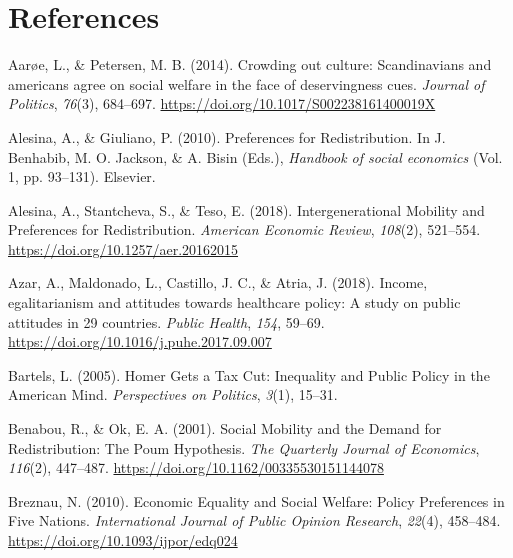 \documentclass[
  12pt,
]{book}
\newlength{\cslhangindent}
\newlength{\cslentryspacingunit} %
\newenvironment{CSLReferences}[2] %
 {%
  \setlength{\parindent}{0pt}
  \ifodd #1
  \let\oldpar\par
  \def\par{\hangindent=\cslhangindent\oldpar}
  \fi
  \setlength{\parskip}{#2\cslentryspacingunit}
 }%
 {}
\begin{document}
\hypertarget{references}{%
\chapter*{References}\label{references}}

\hypertarget{refs}{}
\begin{CSLReferences}{1}{0}
\leavevmode{}%
Aarøe, L., \& Petersen, M. B. (2014). Crowding out culture: {Scandinavians} and americans agree on social welfare in the face of deservingness cues. \emph{Journal of Politics}, \emph{76}(3), 684--697. \url{https://doi.org/10.1017/S002238161400019X}

\leavevmode{}%
Alesina, A., \& Giuliano, P. (2010). Preferences for {Redistribution}. In J. Benhabib, M. O. Jackson, \& A. Bisin (Eds.), \emph{Handbook of social economics} (Vol. 1, pp. 93--131). {Elsevier}.

\leavevmode{}%
Alesina, A., Stantcheva, S., \& Teso, E. (2018). Intergenerational {Mobility} and {Preferences} for {Redistribution}. \emph{American Economic Review}, \emph{108}(2), 521--554. \url{https://doi.org/10.1257/aer.20162015}

\leavevmode{}%
Azar, A., Maldonado, L., Castillo, J. C., \& Atria, J. (2018). Income, egalitarianism and attitudes towards healthcare policy: A study on public attitudes in 29 countries. \emph{Public Health}, \emph{154}, 59--69. \url{https://doi.org/10.1016/j.puhe.2017.09.007}

\leavevmode{}%
Bartels, L. (2005). Homer {Gets} a {Tax Cut}: {Inequality} and {Public Policy} in the {American Mind}. \emph{Perspectives on Politics}, \emph{3}(1), 15--31.

\leavevmode{}%
Benabou, R., \& Ok, E. A. (2001). Social {Mobility} and the {Demand} for {Redistribution}: {The Poum Hypothesis}. \emph{The Quarterly Journal of Economics}, \emph{116}(2), 447--487. \url{https://doi.org/10.1162/00335530151144078}

\leavevmode{}%
Breznau, N. (2010). Economic {Equality} and {Social Welfare}: {Policy Preferences} in {Five Nations}. \emph{International Journal of Public Opinion Research}, \emph{22}(4), 458--484. \url{https://doi.org/10.1093/ijpor/edq024}


\end{CSLReferences}
\end{document}
